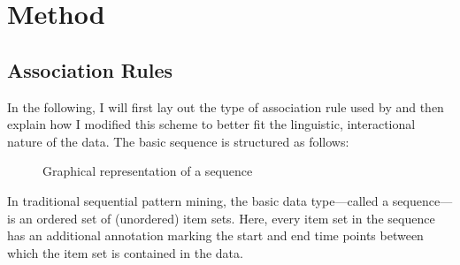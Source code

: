 


\chapter{Method}
\section{Association Rules}
In the following, I will first lay out the type of association rule used by  and then explain how I modified this scheme to better fit the linguistic, interactional nature of the data. The basic sequence is structured as follows:
\begin{quote}
\end{quote}

\begin{figure}
	\center
	
	\caption{Graphical representation of a sequence}
	\label{fig:sequence}
\end{figure}

In traditional sequential pattern mining, the basic data type---called a sequence---is an ordered set of (unordered) item sets. Here, every item set in the sequence has an additional annotation marking the start and end time points between which the item set is contained in the data.
